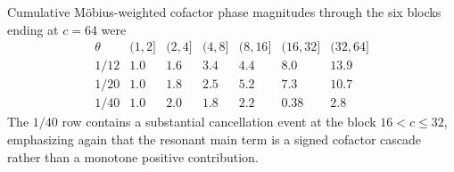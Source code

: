 Cumulative M\"obius-weighted cofactor phase magnitudes through the six blocks ending at $c=64$ were
\begin{equation}
\begin{array}{c|rrrrrr}
\theta & (1,2]&(2,4]&(4,8]&(8,16]&(16,32]&(32,64]\\
\hline
1/12 & 1.0&1.6&3.4&4.4&8.0&13.9\\
1/20 & 1.0&1.8&2.5&5.2&7.3&10.7\\
1/40 & 1.0&2.0&1.8&2.2&0.38&2.8
\end{array}
\label{eq:extended-cofactor-phase-cascade}
\end{equation}
The $1/40$ row contains a substantial cancellation event at the block $16<c\le32$, emphasizing again that the resonant main term is a signed cofactor cascade rather than a monotone positive contribution.
